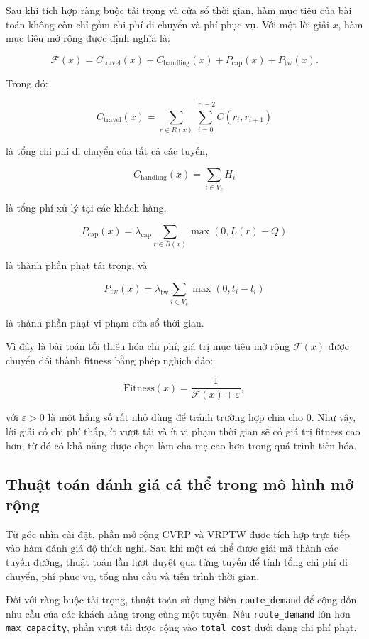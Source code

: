 \documentclass[12pt,a4paper]{article}
\numberwithin{figure}{subsection}
\numberwithin{table}{subsection}
\begin{document}
Sau khi tích hợp ràng buộc tải trọng và cửa sổ thời gian, hàm mục tiêu của bài toán không còn chỉ gồm chi phí di chuyển và phí phục vụ. Với một lời giải $x$, hàm mục tiêu mở rộng được định nghĩa là:

\[
\mathcal{F}(x)
=
C_{\text{travel}}(x)
+
C_{\text{handling}}(x)
+
P_{\text{cap}}(x)
+
P_{\text{tw}}(x).
\]

Trong đó:

\[
C_{\text{travel}}(x)
=
\sum_{r \in R(x)}
\sum_{i=0}^{|r|-2}
C(r_i, r_{i+1})
\]

là tổng chi phí di chuyển của tất cả các tuyến,

\[
C_{\text{handling}}(x)
=
\sum_{i \in V_c} H_i
\]

là tổng phí xử lý tại các khách hàng,

\[
P_{\text{cap}}(x)
=
\lambda_{\text{cap}}
\sum_{r \in R(x)}
\max(0, L(r) - Q)
\]

là thành phần phạt tải trọng, và

\[
P_{\text{tw}}(x)
=
\lambda_{\text{tw}}
\sum_{i \in V_c}
\max(0, t_i - l_i)
\]

là thành phần phạt vi phạm cửa sổ thời gian.

Vì đây là bài toán tối thiểu hóa chi phí, giá trị mục tiêu mở rộng $\mathcal{F}(x)$ được chuyển đổi thành fitness bằng phép nghịch đảo:

\[
\text{Fitness}(x)
=
\frac{1}{\mathcal{F}(x) + \varepsilon},
\]

với $\varepsilon > 0$ là một hằng số rất nhỏ dùng để tránh trường hợp chia cho 0. Như vậy, lời giải có chi phí thấp, ít vượt tải và ít vi phạm thời gian sẽ có giá trị fitness cao hơn, từ đó có khả năng được chọn làm cha mẹ cao hơn trong quá trình tiến hóa.

\subsection{Thuật toán đánh giá cá thể trong mô hình mở rộng}

Từ góc nhìn cài đặt, phần mở rộng CVRP và VRPTW được tích hợp trực tiếp vào hàm đánh giá độ thích nghi. Sau khi một cá thể được giải mã thành các tuyến đường, thuật toán lần lượt duyệt qua từng tuyến để tính tổng chi phí di chuyển, phí phục vụ, tổng nhu cầu và tiến trình thời gian.

Đối với ràng buộc tải trọng, thuật toán sử dụng biến \texttt{route\_demand} để cộng dồn nhu cầu của các khách hàng trong cùng một tuyến. Nếu \texttt{route\_demand} lớn hơn \texttt{max\_capacity}, phần vượt tải được cộng vào \texttt{total\_cost} dưới dạng chi phí phạt.
\end{document}
